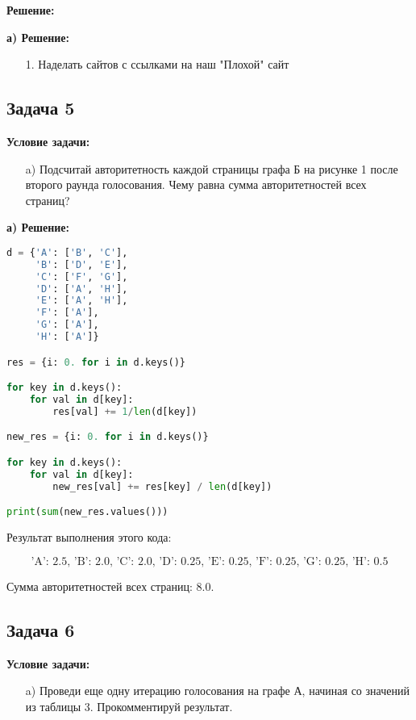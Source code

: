 \documentclass[a4paper,12pt]{article}
\begin{document}
\textbf{Решение:}

\textbf{а) Решение:}
\begin{itemize}
    \item[1.] Наделать сайтов с ссылками на наш "Плохой" сайт
\end{itemize}

\vspace{1cm}

\subsection{Задача 5}
\textbf{Условие задачи:}
\begin{itemize}
    \item[a)] Подсчитай авторитетность каждой страницы графа Б на рисунке 1 после второго раунда голосования. Чему равна сумма авторитетностей всех страниц?
\end{itemize}



\textbf{а) Решение:}

\begin{lstlisting}[language=Python]
d = {'A': ['B', 'C'],
     'B': ['D', 'E'],
     'C': ['F', 'G'],
     'D': ['A', 'H'],
     'E': ['A', 'H'],
     'F': ['A'],
     'G': ['A'],
     'H': ['A']}

res = {i: 0. for i in d.keys()}

for key in d.keys():
    for val in d[key]:
        res[val] += 1/len(d[key])

new_res = {i: 0. for i in d.keys()}

for key in d.keys():
    for val in d[key]:
        new_res[val] += res[key] / len(d[key])

print(sum(new_res.values()))
\end{lstlisting}

Результат выполнения этого кода:

\[
\text{{'A': 2.5, 'B': 2.0, 'C': 2.0, 'D': 0.25, 'E': 0.25, 'F': 0.25, 'G': 0.25, 'H': 0.5}}
\]

Сумма авторитетностей всех страниц: 8.0.
\vspace{1cm}
\subsection{Задача 6}
\textbf{Условие задачи:}
\begin{itemize}
    \item[a)] Проведи еще одну итерацию голосования на графе А, начиная со значений из таблицы 3. Прокомментируй результат.
\end{itemize}
\end{document}

